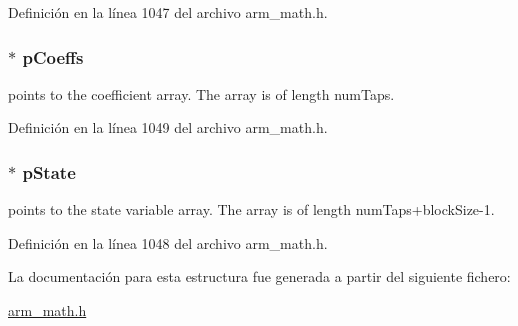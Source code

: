 Definición en la línea 1047 del archivo arm\+\_\+math.\+h.

\subsubsection[{\texorpdfstring{p\+Coeffs}{pCoeffs}}]{$\ast$ p\+Coeffs}\hypertarget{structarm__fir__instance__q7_a54407554b4fe7bbbb43924e4eea45e7f}{}\label{structarm__fir__instance__q7_a54407554b4fe7bbbb43924e4eea45e7f}
points to the coefficient array. The array is of length num\+Taps. 

Definición en la línea 1049 del archivo arm\+\_\+math.\+h.

\subsubsection[{\texorpdfstring{p\+State}{pState}}]{$\ast$ p\+State}\hypertarget{structarm__fir__instance__q7_aa8f67102521b620af6f259afdcf29785}{}\label{structarm__fir__instance__q7_aa8f67102521b620af6f259afdcf29785}
points to the state variable array. The array is of length num\+Taps+block\+Size-\/1. 

Definición en la línea 1048 del archivo arm\+\_\+math.\+h.



La documentación para esta estructura fue generada a partir del siguiente fichero\+:\begin{DoxyCompactItemize}
\item 
\hyperlink{arm__math_8h}{arm\+\_\+math.\+h}\end{DoxyCompactItemize}
